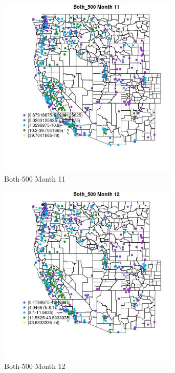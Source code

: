 \begin{figure} 
\centering  
\includegraphics[width=0.77\textwidth]{Code_Outputs/ML_input_report_ML_input_PM25_Step5_part_d_de_duplicated_aves_ML_input_MapObsMo11Both_500.jpg} 
\caption{\label{fig:ML_input_report_ML_input_PM25_Step5_part_d_de_duplicated_aves_ML_inputMapObsMo11Both_500}Both-500 Month 11} 
\end{figure} 
 

\clearpage 

\begin{figure} 
\centering  
\includegraphics[width=0.77\textwidth]{Code_Outputs/ML_input_report_ML_input_PM25_Step5_part_d_de_duplicated_aves_ML_input_MapObsMo12Both_500.jpg} 
\caption{\label{fig:ML_input_report_ML_input_PM25_Step5_part_d_de_duplicated_aves_ML_inputMapObsMo12Both_500}Both-500 Month 12} 
\end{figure} 
 

